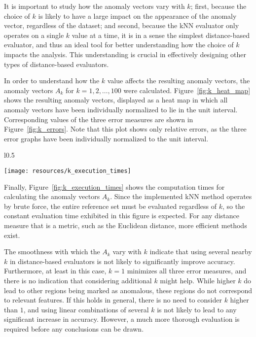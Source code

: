 It is important to study how the anomaly vectors vary with $k$; first, because the choice of $k$ is likely to have a large impact on the appearance of the anomaly vector, regardless of the dataset; and second, because the kNN evaluator only operates on a single $k$ value at a time, it is in a sense the simplest distance-based evaluator, and thus an ideal tool for better understanding how the choice of $k$ impacts the analysis. This understanding is crucial in effectively designing other types of distance-based evaluators. 

In order to understand how the $k$ value affects the resulting anomaly vectors, the anomaly vectors $A_{k}$ for $k = 1,2,\dots,100$ were calculated. Figure~\ref{fig:k_heat_map} shows the resulting anomaly vectors, displayed as a heat map in which all anomaly vectors have been individually normalized to lie in the unit interval. Corresponding values of the three error measures are shown in Figure~\ref{fig:k_errors}. Note that this plot shows only relative errors, as the three error graphs have been individually normalized to the unit interval.

\begin{wrapfigure}{l}{0.5\textwidth}
    \vspace{-20pt}
    \begin{center}
        \texttt{[image: resources/k\_execution\_times]}
    \end{center}
    \vspace{-20pt}
    \caption{\small{Evaluation times when varying $k$ on the standard sequence.}}
    \vspace{-20pt}
\label{fig:k_execution_times}
\end{wrapfigure}

Finally, Figure~\ref{fig:k_execution_times} shows the computation times for calculating the anomaly vectors $A_k$. Since the implemented kNN method operates by brute force, the entire reference set must be evaluated regardless of $k$, so the constant evaluation time exhibited in this figure is expected. For any distance measure that is a metric, such as the Euclidean distance, more efficient methods exist.

The smoothness with which the $A_k$ vary with $k$ indicate that using several nearby $k$ in distance-based evaluators is not likely to significantly improve accuracy. Furthermore, at least in this case, $k=1$ minimizes all three error measures, and there is no indication that considering additional $k$ might help. While higher $k$ do lead to other regions being marked as anomalous, these regions do not correspond to relevant features. If this holds in general, there is no need to consider $k$ higher than $1$, and using linear combinations of several $k$ is not likely to lead to any significant increase in accuracy. However, a much more thorough evaluation is required before any conclusions can be drawn.

